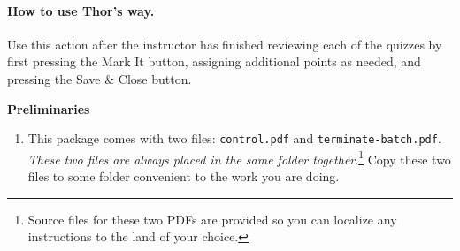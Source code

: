 \documentclass{article}
\begin{document}
\paragraph*{How to use \textsf{Thor's way}.}\label{para:UTW} Use this action after
the instructor has finished reviewing each of the quizzes by first pressing the
\textsf{Mark It} button, assigning additional points as needed, and pressing
the \textsf{Save \& Close} button.

\newtopic\noindent\textbf{Preliminaries}\vspace{-6pt}\relax
\begin{enumerate}
\item[] This package comes with two files: \texttt{control.pdf} and
    \texttt{terminate-batch.pdf}. \emph{These two files are always placed in
    the same folder together}.\footnote{Source files for these two PDFs are provided so you
    can localize any instructions to the land of your choice.} Copy these two files to some folder convenient to the
    work you are doing.
\end{enumerate}

\end{document}
